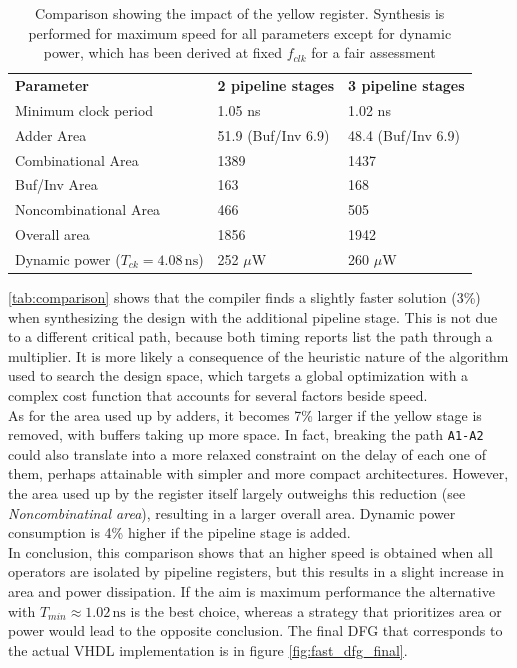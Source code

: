 \begin{table}[h]
	\centering
\begin{tabular}{|l|l|l|}
	\hline
\textbf{Parameter}	&  \textbf{2 pipeline stages} & \textbf{3 pipeline stages} \\\hhline{|=|=|=|}
Minimum clock period & 1.05 ns & 1.02 ns\\\hline
Adder Area & 51.9 (Buf/Inv 6.9) & 48.4 (Buf/Inv 6.9)\\
Combinational Area & 1389 & 1437\\
Buf/Inv Area& 163 & 168\\
Noncombinational Area& 466 & 505\\
Overall area & 1856 & 1942\\
\hline
Dynamic power ($T_{ck}=4.08\,\textrm{ns}$) & 252 $\mu$W & 260 $\mu$W \\
\hline
\end{tabular}
\caption{Comparison showing the impact of the yellow register. Synthesis is performed for maximum speed for all parameters except for dynamic power, which has been derived at fixed $f_{clk}$ for a fair assessment}
\label{tab:comparison}
\end{table}

\autoref{tab:comparison} shows that the compiler finds a slightly faster solution (3\%) when synthesizing the design with the additional pipeline stage. This is not due to a different critical path, because both timing reports list the path through a multiplier. It is more likely a consequence of the heuristic nature of the algorithm used to search the design space, which targets a global optimization with a complex cost function that accounts for several factors beside speed.\\
As for the area used up by adders, it becomes 7\% larger if the yellow stage is removed, with buffers taking up more space. In fact, breaking the path \texttt{A1-A2} could also translate into a more relaxed constraint on the delay of each one of them, perhaps attainable with simpler and more compact architectures. However, the area used up by the register itself largely outweighs this reduction (see \textit{Noncombinatinal area}), resulting in a larger overall area. Dynamic power consumption is 4\% higher if the pipeline stage is added.
\\In conclusion, this comparison shows that an higher speed is obtained when all operators are isolated by pipeline registers, but this results in a slight increase in area and power dissipation. If the aim is maximum performance the alternative with $T_{min}\approx 1.02 \,\textrm{ns}$ is the best choice, whereas a strategy that prioritizes area or power would lead to the opposite conclusion.
The final DFG that corresponds to the actual VHDL implementation is in figure \ref{fig:fast_dfg_final}.

